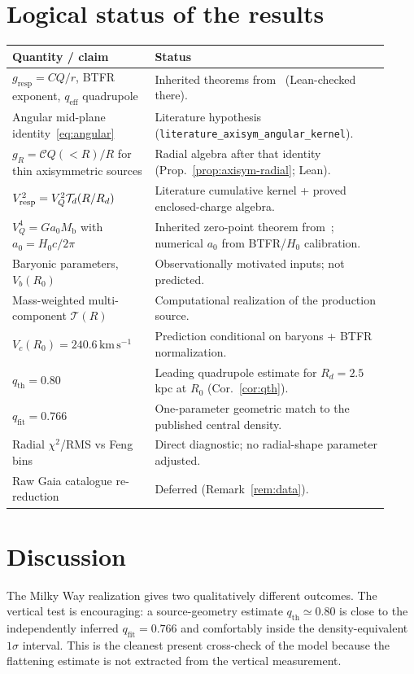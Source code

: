 \documentclass[11pt]{article}
\theoremstyle{definition}
\theoremstyle{remark}
\newcommand{\kms}{\mathrm{km\,s^{-1}}}
\newcommand{\Mb}{M_{\mathrm{b}}}
\newcommand{\qeff}{q_{\mathrm{eff}}}
\newcommand{\qth}{q_{\mathrm{th}}}
\newcommand{\qfit}{q_{\mathrm{fit}}}
\begin{document}
\section{Logical status of the results}
\label{sec:status}
\begin{center}
\small
\begin{tabular}{@{}p{0.34\linewidth}p{0.58\linewidth}@{}}
\toprule
\textbf{Quantity / claim} & \textbf{Status}\\
\midrule
$g_{\mathrm{resp}}=CQ/r$, BTFR exponent, $\qeff$ quadrupole & Inherited theorems from~\cite{boyd2026galactic} (Lean-checked there).\\
Angular mid-plane identity~\eqref{eq:angular} & Literature hypothesis (\texttt{literature\_axisym\_angular\_kernel}).\\
$g_R=\mathcal C Q(<R)/R$ for thin axisymmetric sources & Radial algebra after that identity (Prop.~\ref{prop:axisym-radial}; Lean).\\
$V_{\rm resp}^2=V_Q^2\mathcal T_d(R/R_d)$ & Literature cumulative kernel + proved enclosed-charge algebra.\\
$V_Q^4=Ga_0\Mb$ with $a_0=H_0c/2\pi$ & Inherited zero-point theorem from~\cite{boyd2026galactic}; numerical $a_0$ from BTFR/$H_0$ calibration.\\
Baryonic parameters, $V_b(R_0)$ & Observationally motivated inputs; not predicted.\\
Mass-weighted multi-component $\mathcal T(R)$ & Computational realization of the production source.\\
$V_c(R_0)=240.6\,\kms$ & Prediction conditional on baryons + BTFR normalization.\\
$\qth=0.80$ & Leading quadrupole estimate for $R_d=2.5\,$kpc at $R_0$ (Cor.~\ref{cor:qth}).\\
$\qfit=0.766$ & One-parameter geometric match to the published central density.\\
Radial $\chi^2$/RMS vs Feng bins & Direct diagnostic; no radial-shape parameter adjusted.\\
Raw Gaia catalogue re-reduction & Deferred (Remark~\ref{rem:data}).\\
\bottomrule
\end{tabular}
\end{center}

\section{Discussion}
\label{sec:discussion}
The Milky Way realization gives two qualitatively different outcomes.
The vertical test is encouraging: a source-geometry estimate $\qth\simeq0.80$ is close to the independently inferred $\qfit=0.766$ and comfortably inside the density-equivalent $1\sigma$ interval.
This is the cleanest present cross-check of the model because the flattening estimate is not extracted from the vertical measurement.
\end{document}
